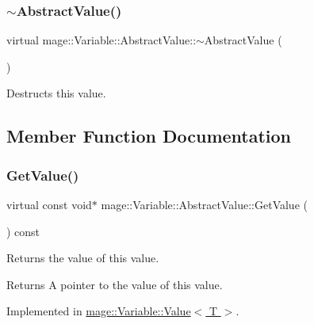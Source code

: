 \subsubsection{\texorpdfstring{$\sim$\+Abstract\+Value()}{~AbstractValue()}}
{\footnotesize\ttfamily virtual mage\+::\+Variable\+::\+Abstract\+Value\+::$\sim$\+Abstract\+Value (\begin{DoxyParamCaption}{ }\end{DoxyParamCaption})\hspace{0.3cm}{\ttfamily [virtual]}}

Destructs this value. 

\subsection{Member Function Documentation}
\hypertarget{structmage_1_1_variable_1_1_abstract_value_aede2a77b571b80794a4254e34144f4c1}{}\label{structmage_1_1_variable_1_1_abstract_value_aede2a77b571b80794a4254e34144f4c1} 
\subsubsection{\texorpdfstring{Get\+Value()}{GetValue()}}
{\footnotesize\ttfamily virtual const void$\ast$ mage\+::\+Variable\+::\+Abstract\+Value\+::\+Get\+Value (\begin{DoxyParamCaption}{ }\end{DoxyParamCaption}) const\hspace{0.3cm}{\ttfamily [pure virtual]}}

Returns the value of this value.

\begin{DoxyReturn}{Returns}
A pointer to the value of this value. 
\end{DoxyReturn}


Implemented in \hyperlink{structmage_1_1_variable_1_1_value_a04d70496ebb7ad71dafa3df877daeb26}{mage\+::\+Variable\+::\+Value$<$ T $>$}.

